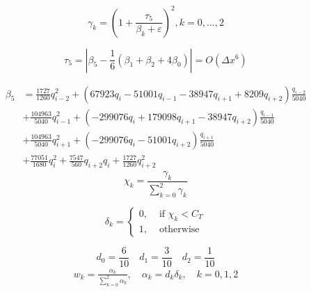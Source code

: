 \begin{equation}
\gamma_{k}=\left(1+\frac{\tau_{5}}{\beta_{k}+\varepsilon}\right)^{2}, k=0, \ldots, 2
\end{equation}

\begin{equation}
\tau_{5}=\left|\beta_{5}-\frac{1}{6}\left(\beta_{1}+\beta_{2}+4 \beta_{0}\right)\right|=O\left(\Delta x^{6}\right)
\end{equation}

\begin{equation}
\begin{aligned}
\beta_{5}&=\frac{1727}{1260}q_{i-2}^2+(67923q_i -51001q_{i-1} -38947q_{i+1}+8209q_{i+2})\frac{q_{i-2}}{5040}\\
&+\frac{104963}{5040}q_{i-1}^2+(-299076q_{i}+179098q_{i+1}-38947q_{i+2})\frac{q_{i-1}}{5040}\\
&+\frac{104963}{5040}q_{i+1}^2+(-299076q_{i}-51001q_{i+2})\frac{q_{i+1}}{5040}\\
&+\frac{77051}{1680}q_{i}^2+\frac{7547}{560}q_{i+2}q_{i}+\frac{1727}{1260}q_{i+2}^2
\end{aligned}
\end{equation}
\begin{equation}
\chi_{k}=\frac{\gamma_{k}}{\sum_{k=0}^{2} \gamma_{k}}
\end{equation}

\begin{equation}
\delta_{k}=\left\{\begin{array}{ll}
0, & \text { if } \chi_{k}<C_{T} \\
1, & \text { otherwise }
\end{array}\right.
\end{equation}

$$d_0=\frac{6}{10} \quad d_1=\frac{3}{10} \quad d_2=\frac{1}{10}$$
\begin{equation}
\begin{array}{l}
w_{k}=\frac{\alpha_{k}}{\sum_{k=0}^{2} \alpha_{k}}, \quad \alpha_{k}=d_k\delta_k, \quad k=0,1,2\\
\end{array}
\end{equation}

